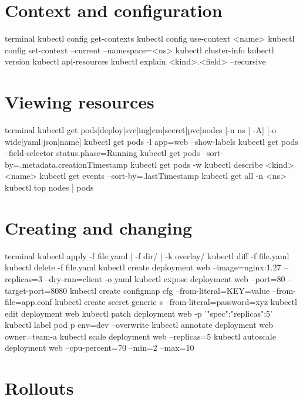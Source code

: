 
\section{Context and configuration}

\begin{bashcode}{terminal}
kubectl config get-contexts
kubectl config use-context <name>
kubectl config set-context --current --namespace=<ns>
kubectl cluster-info
kubectl version
kubectl api-resources
kubectl explain <kind>.<field> --recursive
\end{bashcode}

\section{Viewing resources}

\begin{bashcode}{terminal}
kubectl get pods|deploy|svc|ing|cm|secret|pvc|nodes [-n ns | -A] [-o wide|yaml|json|name]
kubectl get pods -l app=web --show-labels
kubectl get pods --field-selector status.phase=Running
kubectl get pods --sort-by=.metadata.creationTimestamp
kubectl get pods -w
kubectl describe <kind> <name>
kubectl get events --sort-by=.lastTimestamp
kubectl get all -n <ns>
kubectl top nodes | pods
\end{bashcode}

\section{Creating and changing}

\begin{bashcode}{terminal}
kubectl apply -f file.yaml | -f dir/ | -k overlay/
kubectl diff -f file.yaml
kubectl delete -f file.yaml
kubectl create deployment web --image=nginx:1.27 --replicas=3 --dry-run=client -o yaml
kubectl expose deployment web --port=80 --target-port=8080
kubectl create configmap cfg --from-literal=KEY=value --from-file=app.conf
kubectl create secret generic s --from-literal=password=xyz
kubectl edit deployment web
kubectl patch deployment web -p '{"spec":{"replicas":5}}'
kubectl label pod p env=dev --overwrite
kubectl annotate deployment web owner=team-a
kubectl scale deployment web --replicas=5
kubectl autoscale deployment web --cpu-percent=70 --min=2 --max=10
\end{bashcode}

\section{Rollouts}

